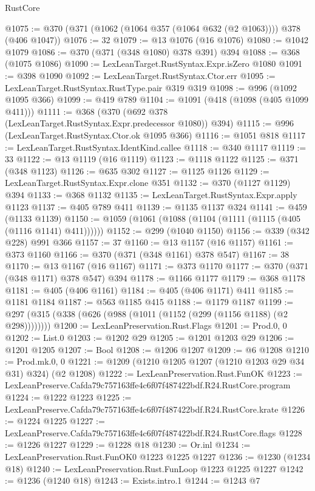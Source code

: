 \begin{lexlean}{RustCore}
\begin{coremodule}
@1075 := @370 (@371 (@1062 (@1064 @357 (@1064 @632 (@2 @1063)))) @378 (@406 @1047))
@1076 := 32
@1079 := @13 @1076 (@16 @1076)
@1080 := @1042 @1079
@1086 := @370 (@371 (@348 @1080) @378 @391) @394
@1088 := @368 (@1075 @1086)
@1090 := LexLeanTarget.RustSyntax.Expr.isZero @1080
@1091 := @398 @1090
@1092 := LexLeanTarget.RustSyntax.Ctor.err
@1095 := LexLeanTarget.RustSyntax.RustType.pair @319 @319
@1098 := @996 (@1092 @1095 @366)
@1099 := @419 @789
@1104 := @1091 (@418 (@1098 (@405 @1099 @411)))
@1111 := @368 (@370 (@692 @378 (LexLeanTarget.RustSyntax.Expr.predecessor @1080)) @394)
@1115 := @996 (LexLeanTarget.RustSyntax.Ctor.ok @1095 @366)
@1116 := @1051 @818
@1117 := LexLeanTarget.RustSyntax.IdentKind.callee
@1118 := @340 @1117
@1119 := 33
@1122 := @13 @1119 (@16 @1119)
@1123 := @1118 @1122
@1125 := @371 (@348 @1123)
@1126 := @635 @302
@1127 := @1125 @1126
@1129 := LexLeanTarget.RustSyntax.Expr.clone @351
@1132 := @370 (@1127 @1129) @394
@1133 := @368 @1132
@1135 := LexLeanTarget.RustSyntax.Expr.apply @1123
@1137 := @405 @789 @411
@1139 := @1135 @1137 @324
@1141 := @459 (@1133 @1139)
@1150 := @1059 (@1061 (@1088 (@1104 (@1111 (@1115 (@405 (@1116 @1141) @411))))))
@1152 := @299 (@1040 @1150)
@1156 := @339 (@342 @228) @991 @366
@1157 := 37
@1160 := @13 @1157 (@16 @1157)
@1161 := @373 @1160
@1166 := @370 (@371 (@348 @1161) @378 @547)
@1167 := 38
@1170 := @13 @1167 (@16 @1167)
@1171 := @373 @1170
@1177 := @370 (@371 (@348 @1171) @378 @547) @394
@1178 := @1166 @1177
@1179 := @368 @1178
@1181 := @405 (@406 @1161)
@1184 := @405 (@406 @1171) @411
@1185 := @1181 @1184
@1187 := @563 @1185 @415
@1188 := @1179 @1187
@1199 := @297 (@315 (@338 (@626 (@988 (@1011 (@1152 (@299 (@1156 @1188) (@2 @298))))))))
@1200 := LexLeanPreservation.Rust.Flags
@1201 := Prod.{0, 0}
@1202 := List.{0}
@1203 := @1202 @29
@1205 := @1201 @1203 @29
@1206 := @1201 @1205
@1207 := Bool
@1208 := @1206 @1207
@1209 := @6 @1208
@1210 := Prod.mk.{0, 0}
@1221 := @1209 (@1210 @1205 @1207 (@1210 @1203 @29 @34 @31) @324) (@2 @1208)
@1222 := LexLeanPreservation.Rust.FunOK
@1223 := LexLeanPreserve.Cafda79c757163ffe4c6f07f487422bdf.R24.RustCore.program
@1224 := @1222 @1223
@1225 := LexLeanPreserve.Cafda79c757163ffe4c6f07f487422bdf.R24.RustCore.krate
@1226 := @1224 @1225
@1227 := LexLeanPreserve.Cafda79c757163ffe4c6f07f487422bdf.R24.RustCore.flags
@1228 := @1226 @1227
@1229 := @1228 @18
@1230 := Or.inl
@1234 := LexLeanPreservation.Rust.FunOK0 @1223 @1225 @1227
@1236 := @1230 (@1234 @18)
@1240 := LexLeanPreservation.Rust.FunLoop @1223 @1225 @1227
@1242 := @1236 (@1240 @18)
@1243 := Exists.intro.{1}
@1244 := @1243 @7

\end{coremodule}
\end{lexlean}
